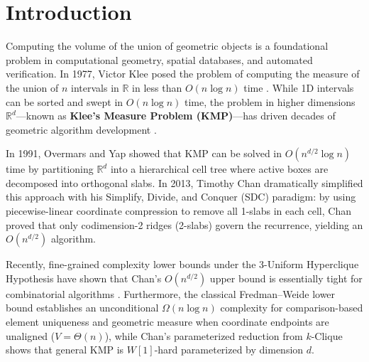 \documentclass[11pt,a4paper]{article}
\theoremstyle{plain}
\theoremstyle{definition}
\begin{document}
\section{Introduction}

Computing the volume of the union of geometric objects is a foundational problem in computational geometry, spatial databases, and automated verification. In 1977, Victor Klee posed the problem of computing the measure of the union of $n$ intervals in $\mathbb{R}$ in less than $O(n \log n)$ time \cite{klee1977measure}. While 1D intervals can be sorted and swept in $O(n \log n)$ time, the problem in higher dimensions $\mathbb{R}^d$---known as \textbf{Klee's Measure Problem (KMP)}---has driven decades of geometric algorithm development \cite{bentley1977algorithms, overmars1991new, chan2013klee}.

In 1991, Overmars and Yap \cite{overmars1991new} showed that KMP can be solved in $O(n^{d/2} \log n)$ time by partitioning $\mathbb{R}^d$ into a hierarchical cell tree where active boxes are decomposed into orthogonal slabs. In 2013, Timothy Chan \cite{chan2013klee} dramatically simplified this approach with his Simplify, Divide, and Conquer (SDC) paradigm: by using piecewise-linear coordinate compression to remove all 1-slabs in each cell, Chan proved that only codimension-2 ridges (2-slabs) govern the recurrence, yielding an $O(n^{d/2})$ algorithm.

Recently, fine-grained complexity lower bounds under the 3-Uniform Hyperclique Hypothesis have shown that Chan's $O(n^{d/2})$ upper bound is essentially tight for combinatorial algorithms \cite{kunnemann2022tight, gorbachev2023combinatorial}. Furthermore, the classical Fredman--Weide lower bound establishes an unconditional $\Omega(n \log n)$ complexity for comparison-based element uniqueness and geometric measure when coordinate endpoints are unaligned ($V = \Theta(n)$), while Chan's parameterized reduction from $k$-Clique shows that general KMP is $W[1]$-hard parameterized by dimension $d$.
\end{document}
